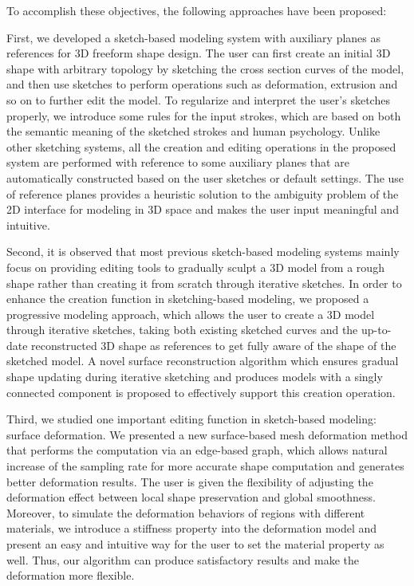 To accomplish these objectives, the following approaches have been
proposed:

First, we developed a sketch-based modeling system with auxiliary
planes as  references for 3D freeform shape design. The user can
first create an initial 3D shape with arbitrary topology by
sketching the cross section curves of the model, and then use
sketches to perform operations such as deformation, extrusion and so on
to further edit the
model. To regularize and interpret the user's sketches properly, we
introduce some rules for the input strokes, which are based on both
the semantic meaning of the sketched strokes and human psychology.
Unlike other sketching systems, all the creation and editing
operations in the proposed system are performed with reference to
some auxiliary planes that are automatically constructed based on
the user sketches or default settings. The use of reference planes
provides a heuristic solution to the ambiguity problem of the 2D
interface for modeling in 3D space and makes the user input
meaningful and intuitive.

Second, it is observed that most previous sketch-based modeling
systems mainly focus on providing editing tools to gradually sculpt
a 3D model from a rough shape rather than creating it from scratch
through iterative sketches. In order to enhance the creation
function in sketching-based modeling, we proposed a progressive
modeling approach, which allows the user to create a 3D model
through iterative sketches, taking both existing sketched curves and
the up-to-date reconstructed 3D shape as references to get fully
aware of the shape of the sketched model. A novel surface
reconstruction algorithm which ensures gradual shape updating during
iterative sketching and produces models with a singly connected
component is proposed to effectively support this creation
operation.

Third, we studied one important editing function in sketch-based
modeling: surface deformation. We presented a new surface-based mesh
deformation method that performs the computation via an edge-based
graph, which allows natural increase of the sampling rate for more
accurate shape computation and generates better deformation results.
The user is given the flexibility of adjusting the deformation
effect between local shape preservation and global smoothness.
Moreover, to simulate the deformation behaviors of regions with
different materials, we introduce a stiffness property into the
deformation model and present an easy and intuitive way for the user
to set the material property as well. Thus, our algorithm can produce
satisfactory results and make the deformation more flexible.

